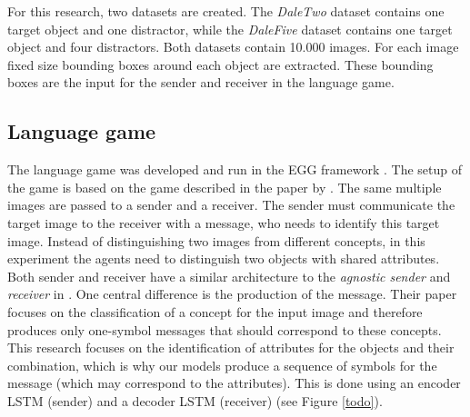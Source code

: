 \documentclass[11pt]{article}
\begin{document}
For this research, two datasets are created. The \emph{DaleTwo} dataset contains one target object and one distractor, while the \emph{DaleFive} dataset contains one target object and four distractors. Both datasets contain 10.000 images. For each image fixed size bounding boxes around each object are extracted. These bounding boxes are the input for the sender and receiver in the language game.


\subsection{Language game}
The language game was developed and run in the EGG framework \citep{Kharitonov2019}. The setup of the game is based on the game described in the paper by \citet{Lazaridou2016}. The same multiple images are passed to a sender and a receiver. The sender must communicate the target image to the receiver with a message, who needs to identify this target image. Instead of distinguishing two images from different concepts, in this experiment the agents need to distinguish two objects with shared attributes. Both sender and receiver have a similar architecture to the \emph{agnostic sender} and \emph{receiver} in \citet{Lazaridou2016}. One central difference is the production of the message. Their paper focuses on the classification of a concept for the input image and therefore produces only one-symbol messages that should correspond to these concepts. This research focuses on the identification of attributes for the objects and their combination, which is why our models produce a sequence of symbols for the message (which may correspond to the attributes). This is done using an encoder LSTM (sender) and a decoder LSTM (receiver) (see Figure \ref*{todo}).

\end{document}
